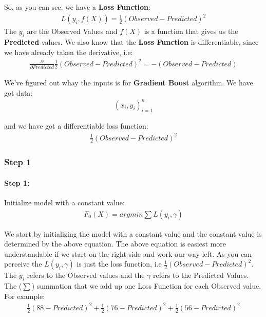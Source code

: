 \documentclass[12pt, a4paper]{article} %
\begin{document}
So, as you can see, we have a \textbf{Loss Function}:
\begin{align*}
    L(y_{i}, f(X)) =
    \frac{1}{2}(Observed - Predicted)^2
\end{align*}
The $y_{i}$ are the Observed Values and $f(X)$ is a function that gives us the \textbf{Predicted} values. We also know that the \textbf{Loss Function} is differentiable, since we have already taken the derivative, i.e:
\begin{align*}
    \frac{\partial}{\partial Predicted} \frac{1}{2}(Observed - Predicted)^2 = -(Observed - Predicted)
\end{align*}

We've figured out whay the inputs is for \textbf{Gradient Boost} algorithm. We have got data:
\begin{align*}
    (x_{i}, y_{i})^n_{i = 1}
\end{align*}

and we have got a differentiable loss function:
\begin{align*}
    \frac{1}{2}(Observed - Predicted)^2 
\end{align*}



\subsubsection{Step 1}

\paragraph{Step 1:} Initialize model with a constant value:
\begin{align*}
    F_{0}(X) = argmin \sum L(y_{i}, \gamma)
\end{align*}

We start by initializing the model with a constant value and the constant value is determined by the above equation. The above equation is easiest more understandable if we start on the right side and work our way left. As you can perceive the $L(y_{i}, \gamma)$ is just the loss function, i.e $\frac{1}{2}(Observed - Predicted)^2$. The $y_{i}$ refers to the Observed values and the $\gamma$ refers to the Predicted Values. The ($\sum$) summation that we add up one Loss Function for each Observed value. For example:
\begin{align*}
    \frac{1}{2}(88 - Predicted)^2 + \frac{1}{2}(76 - Predicted)^2 +
    \frac{1}{2}(56 - Predicted)^2 
\end{align*}
\end{document}
